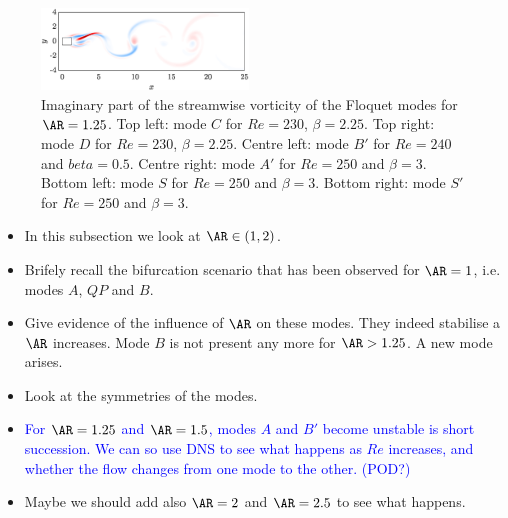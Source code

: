 \begin{figure}
  \includegraphics[width=0.49\textwidth]{./fig/AR1p25/omegax_Re250_beta_3_modeSp.eps}
  \caption{Imaginary part of the streamwise vorticity of the Floquet modes for $\AR=1.25$. Top left: mode $C$ for $Re=230$, $\beta=2.25$. Top right: mode $D$ for $Re=230$, $\beta=2.25$. Centre left: mode $B'$ for $Re=240$ and $beta=0.5$. Centre right: mode $A'$ for $Re=250$ and $\beta=3$. Bottom left: mode $S$ for $Re=250$ and $\beta=3$. Bottom right: mode $S'$ for $Re=250$ and $\beta=3$.}
  \label{fig:modes_AR1p25}
\end{figure}


\begin{itemize}
  \item In this subsection we look at $\AR \in (1,2)$.
  \item Brifely recall the bifurcation scenario that has been observed for $\AR=1$, i.e. modes $A$, $QP$ and $B$.
  \item Give evidence of the influence of $\AR$ on these modes. They indeed stabilise a $\AR$ increases. Mode $B$ is not present any more for $\AR>1.25$. A new mode arises.
  \item Look at the symmetries of the modes.  
  \item \textcolor{blue}{For $\AR=1.25$ and $\AR=1.5$, modes $A$ and $B'$ become unstable is short succession. We can so use DNS to see what happens as $Re$ increases, and whether the flow changes from one mode to the other. (POD?)}
  \item Maybe we should add also $\AR=2$ and $\AR=2.5$ to see what happens.
\end{itemize}
